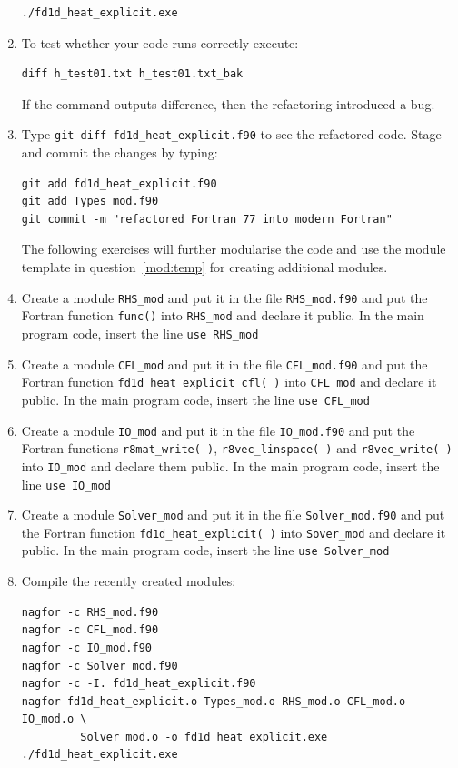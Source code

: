 \documentclass[12pt]{article}
\begin{document}
\begin{enumerate}
\begin{verbatim}
./fd1d_heat_explicit.exe
\end{verbatim}
\item To test whether your code runs correctly execute:
\begin{verbatim}
diff h_test01.txt h_test01.txt_bak
\end{verbatim}
If the command outputs difference, then the refactoring introduced a bug.
\item Type \texttt{git diff fd1d\_heat\_explicit.f90} to see the refactored code. Stage and commit
the changes by typing: 
\begin{verbatim}
git add fd1d_heat_explicit.f90
git add Types_mod.f90
git commit -m "refactored Fortran 77 into modern Fortran"
\end{verbatim}
The following exercises will further modularise the code and use the module template in
  question~\ref{mod:temp} for creating additional modules.
\item Create a module \texttt{RHS\_mod} and put it in the file \texttt{RHS\_mod.f90} and put the 
Fortran function \texttt{func()} into \texttt{RHS\_mod} and declare it public. In the main program code, 
insert the line \texttt{use RHS\_mod} 
\item Create a module \texttt{CFL\_mod} and put it in the file \texttt{CFL\_mod.f90} and put the
  Fortran function \texttt{fd1d\_heat\_explicit\_cfl( )} into \texttt{CFL\_mod} and declare it
  public. In the main program
code, insert the line \texttt{use CFL\_mod}
\item Create a module \texttt{IO\_mod} and put it in the file \texttt{IO\_mod.f90} and put
  the Fortran functions \texttt{r8mat\_write( )}, \texttt{r8vec\_linspace( )} and \texttt{r8vec\_write( )}
  into \texttt{IO\_mod} and declare them public. In the main program code, insert the line \texttt{use IO\_mod}
\item Create a module \texttt{Solver\_mod} and put it in the file \texttt{Solver\_mod.f90} and put the
  Fortran function \texttt{fd1d\_heat\_explicit( )} into \texttt{Sover\_mod} and declare it public. In the main
  program code, insert the line \texttt{use Solver\_mod}
\item Compile the recently created modules:
\begin{verbatim}
nagfor -c RHS_mod.f90
nagfor -c CFL_mod.f90
nagfor -c IO_mod.f90
nagfor -c Solver_mod.f90
nagfor -c -I. fd1d_heat_explicit.f90
nagfor fd1d_heat_explicit.o Types_mod.o RHS_mod.o CFL_mod.o IO_mod.o \
         Solver_mod.o -o fd1d_heat_explicit.exe
./fd1d_heat_explicit.exe
\end{verbatim}

\end{enumerate}
\end{document}
